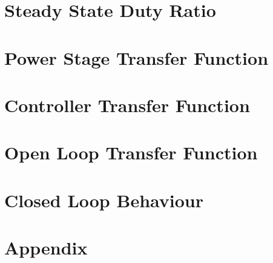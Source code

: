 

%


\vfill{}
\tableofcontents
\vfill{}
\clearpage

\part{Steady State Duty Ratio}
			\clearpage
\part{Power Stage Transfer Function}
			\clearpage
\part{Controller Transfer Function}
			\clearpage
\part{Open Loop Transfer Function}
			\clearpage
\part{Closed Loop Behaviour}
			\clearpage
\part{Appendix}
		\clearpage

